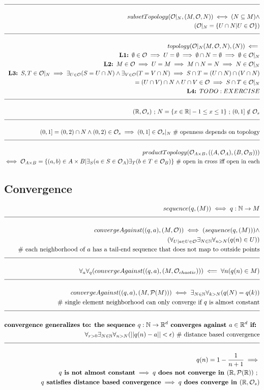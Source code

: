 \documentclass[a4paper]{article}
\newcommand{\eqComment}[1]{\text{  \# #1}}
\newcommand{\eqSep}{\text{ ;  }}
\newcommand{\n}{\\[1.5ex] \hline \nonumber \\[0ex]}
\newcommand{\m}{\nonumber \\}
\begin{document}
\begin{tcolorbox}
\begin{align}
\n subsetTopology(\mathcal{O}|_N, (M, \mathcal{O}, N)) \iff (N \subseteq M) \land 
\m (\mathcal{O}|_N = \{U \cap N| U \in \mathcal{O}\})
\n topology(\mathcal{O}|_N(M, \mathcal{O}, N), (N)) \impliedby
\m \textbf{L1: } \emptyset \in \mathcal{O} \implies U = \emptyset \implies \emptyset \cap N = \emptyset \implies \emptyset \in  \mathcal{O}|_N
\m \textbf{L2: } M \in \mathcal{O} \implies U = M \implies M \cap N = N \implies N \in \mathcal{O}|_N
\m \textbf{L3: } S, T \in \mathcal{O}|_N \implies \exists_{U \in \mathcal{O}} (S = U \cap N) \land \exists_{V \in \mathcal{O}} (T = V \cap N) \implies S \cap T = (U \cap N) \cap (V \cap N)
\m = (U \cap V) \cap N \land U \cap V \in \mathcal{O} \implies S \cap T \in \mathcal{O}|_N
\m \textbf{L4: } TODO: EXERCISE
\n (\mathbb{R}, \mathcal{O}_s) \eqSep N = \{x \in \mathbb{R} | -1 \leq x \leq 1\} \eqSep (0, 1] \notin \mathcal{O}_s
\n (0, 1] = (0, 2) \cap N \land (0, 2) \in \mathcal{O}_s \implies (0 ,1] \in \mathcal{O}_s|_N \eqComment{openness depends on topology}
\n productTopology(\mathcal{O}_{A \times B}, ((A, \mathcal{O}_A), (B, \mathcal{O}_B)))
\m \iff  \mathcal{O}_{A \times B} = \{(a, b) \in A \times B| \exists_{S} (a \in S \in \mathcal{O}_A) \exists_{T} (b \in T \in \mathcal{O}_B)\} \eqComment{open in cross iff open in each}
\end{align}
\end{tcolorbox}

\subsection{Convergence}
\begin{tcolorbox}
\begin{align}
   sequence(q, (M)) \iff q: \mathbb{N} \to M
\n convergeAgainst((q, a), (M, \mathcal{O})) \iff (sequence(q, (M))) \land
\m (\forall_{U | a \in U \in \mathcal{O}} \exists_{N \in \mathbb{N}} \forall_{n > N} (q(n) \in U))
\m \eqComment{each neighborhood of $a$ has a tail-end sequence that does not map to outside points}
\n \forall_a \forall_q (convergeAgainst((q, a), (M, \mathcal{O}_{chaotic}))) \impliedby \forall{n} (q(n) \in M)
\n convergeAgainst((q, a), (M, \mathcal{P}(M))) \iff \exists_{N \in \mathbb{N}} \forall_{k > N} (q(N) = q(k)) 
\m \eqComment{single element neighborhood can only converge if $q$ is almost constant} 
\n \textbf{convergence generalizes to: the sequence $q: \mathbb{N} \to \mathbb{R}^d$ converges against $a \in \mathbb{R}^d$ if: }
\m \forall_{r > 0} \exists_{N \in \mathbb{N}} \forall_{n > N} (|| q(n) - a || < \epsilon) \eqComment{distance based convergence}
\n q(n) = 1 - \frac{1}{n + 1} \implies
\m \textbf{$q$ is not almost constant} \implies \textbf{$q$ does not converge in $(\mathbb{R}, \mathcal{P}(\mathbb{R}))$} \eqSep
\m \textbf{$q$ satisfies distance based convergence} \implies \textbf{$q$ does converge in $(\mathbb{R}, \mathcal{O}_s)$}
\end {align}
\end{tcolorbox}
\end{document}
